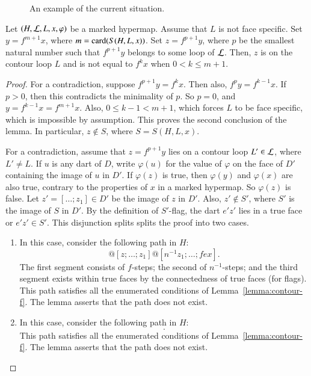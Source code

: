 \begin{figure}[htb]
\centering
{}
\caption{An example of the current situation.}
\label{fig:graph-gen}
\end{figure}


\begin{lemma} \label{lemma:yz}
Let $(H,{\cal L},L,x,\varphi)$ be a marked hypermap.
Assume that  $L$ is not face specific.
Set  $y = f^{m+1} x$, where $m = {\operatorname{card}}(S(H,L,x))$.
  Set
$z=f^{p+1} y$, where $p$ be the smallest natural number 
such that $f^{p+1} y$ belongs to some loop of ${\cal L}$.
Then, $z$ is on the contour loop $L$ and is not
equal to $f^k x$ when $0 < k \le {m+1}$.
\end{lemma}

\begin{proof} 
  For a contradiction, suppose $f^{p+1} y = f^k x$. Then also, $f^p y
  = f^{k-1} x$.  If $p>0$, then this contradicts the minimality of
  $p$.  So $p=0$, and $y=f^{k-1} x = f^{m+1} x$.  Also, $0\le k-1 <
  {m+1}$, which forces  $L$ to be face specific, which is
  impossible by assumption.  This proves the second conclusion of the
  lemma.  In particular, $z\not\in S$, where $S = S(H,L,x)$.

For a contradiction, assume that $z = f^{p+1} y$ lies on a
contour loop $L'\in {\cal L}$, where $L'\ne L$.  
If $u$ is any dart of $D$, write $\varphi(u)$ for the value
of $\varphi$ on the face of $D'$ containing the image of $u$ in $D'$.
If $\varphi(z)$ is true, then $\varphi(y)$
and $\varphi(x)$ are also true, contrary to the properties of $x$
in a marked hypermap.
So $\varphi(z)$ is false.  Let $z' = [\ldots;z_1]\in D'$ be the
image of $z$ in $D'$.  
Also, $z'\not\in S'$, where  $S'$ is the image of $S$ in $D'$.  By the definition of
$S'$-flag, the dart $e'z'$ lies in a true face or $e'z'\in S'$.  This disjunction splits
splits the proof into two cases.
\begin{enumerate}
\item{}  In this case, consider the following
path in $H$:
\begin{displaymath}
[y;fy;\ldots;z] @ [z;\ldots;z_1] @ [n^{-1} z_1;\ldots;f e x].
\end{displaymath}
The first segment consists of $f$-steps; the second of $n^{-1}$-steps;
and the third segment exists within true faces by the connectedness of
true faces (for flags).  This path satisfies all the enumerated
conditions of Lemma~\ref{lemma:contour-f}.  The lemma asserts that the
path does not exist.
\item 
\claim {[$e'z'\in S$.]}  In this case,  consider the following path in $H$:
\begin{displaymath}
[y;f y;\ldots;z].
\end{displaymath}
This path satisfies all the enumerated conditions of
Lemma~\ref{lemma:contour-f}.  The lemma asserts that the path does not
exist.
\end{enumerate}
\end{proof}



